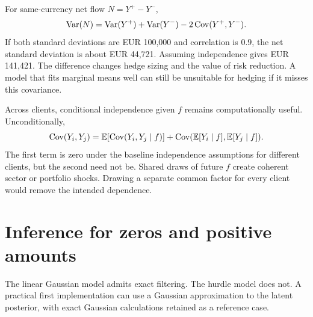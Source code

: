For same-currency net flow $N=Y^+-Y^-$,
\begin{equation}
\operatorname{Var}(N)=\operatorname{Var}(Y^+)+\operatorname{Var}(Y^-)-2\operatorname{Cov}(Y^+,Y^-).
\label{eq:netvariance}
\end{equation}
If both standard deviations are EUR 100,000 and correlation is $0.9$, the net standard deviation is about EUR 44,721. Assuming independence gives EUR 141,421. The difference changes hedge sizing and the value of risk reduction. A model that fits marginal means well can still be unsuitable for hedging if it misses this covariance.

Across clients, conditional independence given $f$ remains computationally useful. Unconditionally,
\begin{equation}
\operatorname{Cov}(Y_i,Y_j)=
\mathbb E[\operatorname{Cov}(Y_i,Y_j\mid f)]+
\operatorname{Cov}(\mathbb E[Y_i\mid f],\mathbb E[Y_j\mid f]).
\end{equation}
The first term is zero under the baseline independence assumptions for different clients, but the second need not be. Shared draws of future $f$ create coherent sector or portfolio shocks. Drawing a separate common factor for every client would remove the intended dependence.

\section{Inference for zeros and positive amounts}
The linear Gaussian model admits exact filtering. The hurdle model does not. A practical first implementation can use a Gaussian approximation to the latent posterior, with exact Gaussian calculations retained as a reference case.

